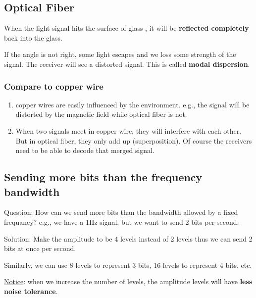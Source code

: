\documentclass{../../ainote}
\begin{document}
\subsection{Optical Fiber}
When the light signal hits the surface of glass , it will be \textbf{reflected completely} back into the glass. 

If the angle is not right, some light escapes and we loss some strength of the signal. The receiver will see a distorted signal. This is called \textbf{modal dispersion}.

\subsubsection{Compare to copper wire}
\begin{enumerate}[leftmargin=*]
    \item copper wires are easily influenced by the environment. e.g., the signal will be distorted by the magnetic field while optical fiber is not.
    \item When two signals meet in copper wire, they will interfere with each other. But in optical fiber, they only add up (superposition). Of course the receivers need to be able to decode that merged signal.
\end{enumerate}

\subsection{Sending more bits than the frequency bandwidth}
Question: How can we send more bits than the bandwidth allowed by a fixed frequancy? e.g., we have a 1Hz signal, but we want to send 2 bits per second.

Solution: Make the amplitude to be 4 levels instead of 2 levels thus we can send 2 bits at once per second.

Similarly, we can use 8 levels to represent 3 bits, 16 levels to represent 4 bits, etc.

\underline{Notice}: when we increase the number of levels, the amplitude levels will have \textbf{less noise tolerance}. 
\end{document}

